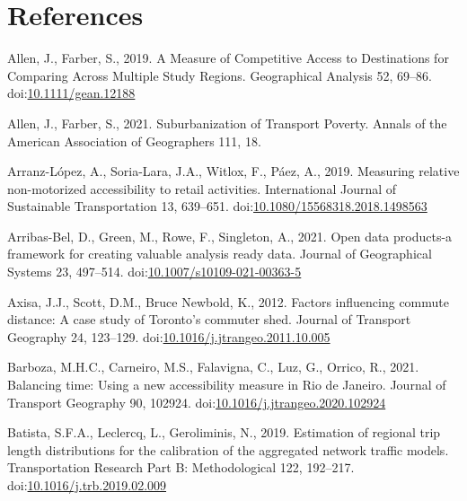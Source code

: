\documentclass[]{elsarticle} %
\newlength{\cslhangindent}
\newlength{\cslentryspacingunit} %
\newenvironment{CSLReferences}[2] %
 {%
  \setlength{\parindent}{0pt}
  \ifodd #1
  \let\oldpar\par
  \def\par{\hangindent=\cslhangindent\oldpar}
  \fi
  \setlength{\parskip}{#2\cslentryspacingunit}
 }%
 {}
\begin{document}
\hypertarget{references}{%
\section*{References}\label{references}}

\hypertarget{refs}{}
\begin{CSLReferences}{1}{0}
\leavevmode{}%
Allen, J., Farber, S., 2019. A Measure of Competitive Access to
Destinations for Comparing Across Multiple Study Regions. Geographical
Analysis 52, 69--86.
doi:\href{https://doi.org/10.1111/gean.12188}{10.1111/gean.12188}

\leavevmode{}%
Allen, J., Farber, S., 2021. Suburbanization of {Transport} {Poverty}.
Annals of the American Association of Geographers 111, 18.

\leavevmode{}%
Arranz-López, A., Soria-Lara, J.A., Witlox, F., Páez, A., 2019.
Measuring relative non-motorized accessibility to retail activities.
International Journal of Sustainable Transportation 13, 639--651.
doi:\href{https://doi.org/10.1080/15568318.2018.1498563}{10.1080/15568318.2018.1498563}

\leavevmode{}%
Arribas-Bel, D., Green, M., Rowe, F., Singleton, A., 2021. Open data
products-a framework for creating valuable analysis ready data. Journal
of Geographical Systems 23, 497--514.
doi:\href{https://doi.org/10.1007/s10109-021-00363-5}{10.1007/s10109-021-00363-5}

\leavevmode{}%
Axisa, J.J., Scott, D.M., Bruce Newbold, K., 2012. Factors influencing
commute distance: A case study of {Toronto}'s commuter shed. Journal of
Transport Geography 24, 123--129.
doi:\href{https://doi.org/10.1016/j.jtrangeo.2011.10.005}{10.1016/j.jtrangeo.2011.10.005}

\leavevmode{}%
Barboza, M.H.C., Carneiro, M.S., Falavigna, C., Luz, G., Orrico, R.,
2021. Balancing time: {Using} a new accessibility measure in {Rio} de
{Janeiro}. Journal of Transport Geography 90, 102924.
doi:\href{https://doi.org/10.1016/j.jtrangeo.2020.102924}{10.1016/j.jtrangeo.2020.102924}

\leavevmode{}%
Batista, S.F.A., Leclercq, L., Geroliminis, N., 2019. Estimation of
regional trip length distributions for the calibration of the aggregated
network traffic models. Transportation Research Part B: Methodological
122, 192--217.
doi:\href{https://doi.org/10.1016/j.trb.2019.02.009}{10.1016/j.trb.2019.02.009}


\end{CSLReferences}
\end{document}
